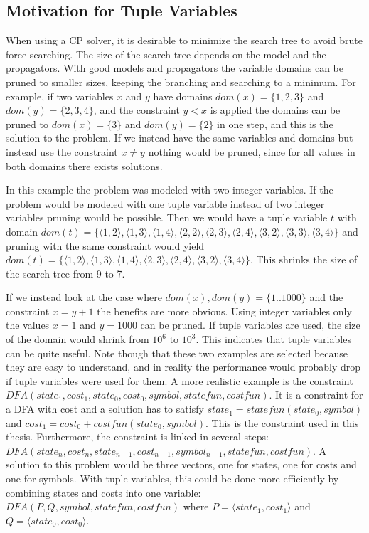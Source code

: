\documentclass[a4paper,11pt]{article}
\begin{document}
\subsection{Motivation for Tuple Variables}
When using a CP solver, it is desirable to minimize the search tree to avoid brute force searching. The size of the search tree depends on the model and the propagators. With good models and propagators the variable domains can be pruned to smaller sizes, keeping the branching and searching to a minimum. For example, if two variables $x$ and $y$ have domains $dom(x)=\{1,2,3\}$ and $dom(y)=\{2,3,4\}$, and the constraint $y<x$ is applied the domains can be pruned to $dom(x)=\{3\}$ and $dom(y)=\{2\}$ in one step, and this is the solution to the problem. If we instead have the same variables and domains but instead use the constraint $x\neq y$ nothing would be pruned, since for all values in both domains there exists solutions. 

In this example the problem was modeled with two integer variables. If the problem would be modeled with one tuple variable instead of two integer variables pruning would be possible. Then we would have a tuple variable $t$ with domain $dom(t)=\{\langle1,2\rangle,\langle1,3\rangle,\langle1,4\rangle,\langle2,2\rangle,\langle2,3\rangle,\langle2,4\rangle,\langle3,2\rangle,\langle3,3\rangle,\langle3,4\rangle\}$ and pruning with the same constraint would yield $dom(t)=\{\langle1,2\rangle,\langle1,3\rangle,\langle1,4\rangle,\langle2,3\rangle,\langle2,4\rangle,\langle3,2\rangle,\langle3,4\rangle\}$. This shrinks the size of the search tree from 9 to 7. 

If we instead look at the case where $dom(x),dom(y)=\{1..1000\}$ and the constraint $x=y+1$ the benefits are more obvious. Using integer variables only the values $x=1$ and $y=1000$ can be pruned. If tuple variables are used, the size of the domain would shrink from $10^6$ to $10^3$. This indicates that tuple variables can be quite useful. Note though that these two examples are selected because they are easy to understand, and in reality the performance would probably drop if tuple variables were used for them. A more realistic example is the constraint $DFA(state_1, cost_1, state_0, cost_0, symbol, statefun, costfun)$. It is a constraint for a DFA with cost and a solution has to satisfy $state_1= statefun(state_0, symbol)$ and $cost_1=cost_0+costfun(state_0, symbol)$. This is the constraint used in this thesis. Furthermore, the constraint is linked in several steps: $DFA(state_n, cost_n, state_{n-1}, cost_{n-1}, symbol_{n-1}, statefun, costfun)$. A solution to this problem would be three vectors, one for states, one for costs and one for symbols. With tuple variables, this could be done more efficiently by combining states and costs into one variable: $DFA(P, Q, symbol, statefun, costfun)$ where $P=\langle state_1, cost_1\rangle$ and $Q=\langle state_0, cost_0\rangle$.
\end{document}
